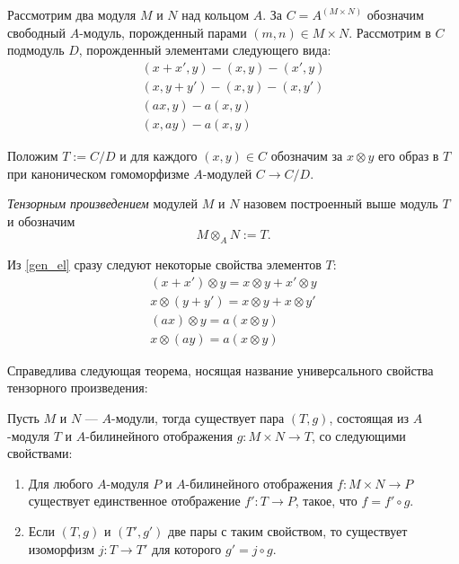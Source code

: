     Рассмотрим два модуля $M$ и $N$ над кольцом $A$. За $C = A^{(M \times N)}$ обозначим свободный $A$-модуль, 
    порожденный парами $(m, n) \in M \times N$. Рассмотрим в $C$ подмодуль $D$, порожденный элементами следующего вида:
    \begin{equation}\label{gen_el}
        \begin{split}
            (x + x', y) - (x, y) - (x', y) \\
            (x, y + y') - (x, y) - (x, y') \\ 
            (ax, y) - a(x, y) \\
            (x, ay) - a(x, y) 
        \end{split}
    \end{equation}

    Положим $T := C/D$ и для каждого $(x, y) \in C$ обозначим за $x \otimes y$ его образ в $T$ при каноническом гомоморфизме $A$-модулей $C \rightarrow C/D$.
    
    \begin{Def}
        \textit{Тензорным произведением} модулей $M$ и $N$ назовем построенный выше модуль $T$ и обозначим $$M \otimes_A N := T.$$
    \end{Def}
    
    Из \eqref{gen_el} сразу следуют некоторые свойства элементов $T$:
    \begin{equation*}\label{tensor_prop}
        \begin{split}
            (x + x') \otimes y = x \otimes y + x' \otimes y\\
            x \otimes (y + y') = x \otimes y + x \otimes y' \\ 
            (ax) \otimes y = a(x \otimes y) \\
            x \otimes (ay) = a(x \otimes y)
        \end{split}
    \end{equation*}

    Справедлива следующая теорема, носящая название универсального свойства тензорного произведения:
    \begin{Theorem}{\cite{A-M}} Пусть $M$ и $N$ --- $A$-модули, тогда существует пара $(T, g)$, состоящая из $A$-модуля $T$ и $A$-билинейного 
        отображения  $g: M \times N \rightarrow T$, со следующими свойствами:
        \begin{enumerate}
            \item Для любого $A$-модуля $P$ и $A$-билинейного отображения $f : M\times N \rightarrow P$ существует
                единственное отображение $f' : T \rightarrow P$, такое, что $f = f' \circ g$.
            \item Если $(T, g)$ и $(T', g')$ две пары с таким свойством, то существует изоморфизм $j : T \rightarrow T'$ для
                которого $g' = j \circ g$.
        \end{enumerate}
    \end{Theorem}


